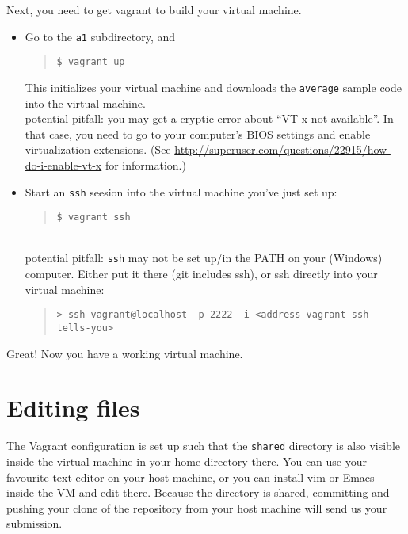 \documentclass[10pt,hidelinks]{article}
\begin{document}
Next, you need to get vagrant to build your virtual machine.
\begin{itemize}
\item Go to the {\tt a1} subdirectory, and
  \begin{quote}
    \verb+$ vagrant up+
  \end{quote}
  This initializes your virtual machine and downloads the {\tt average} sample code into the virtual machine. \\
  potential pitfall: you may get a cryptic error about ``VT-x not available''. In that case, you need to go to your computer's BIOS settings and enable virtualization extensions. (See \url{http://superuser.com/questions/22915/how-do-i-enable-vt-x} for information.)
\item Start an {\tt ssh} seesion into the virtual machine you've just set up:
  \begin{quote}
    \verb+$ vagrant ssh+
  \end{quote} ~\\[-1em]
  potential pitfall: {\tt ssh} may not be set up/in the PATH on your (Windows) computer. Either put it there (git includes ssh), or ssh directly into your virtual machine:
  \begin{quote}
    \verb+> ssh vagrant@localhost -p 2222 -i <address-vagrant-ssh-tells-you>+
  \end{quote}
\end{itemize}
Great! Now you have a working virtual machine.

\section*{Editing files}
The Vagrant configuration is set up such that the {\tt shared}
directory is also visible inside the virtual machine in your home
directory there.  You can use your favourite text editor on your host
machine, or you can install vim or Emacs inside the VM and edit
there. Because the directory is shared, committing and pushing your
clone of the repository from your host machine will send us your
submission.
\end{document}
